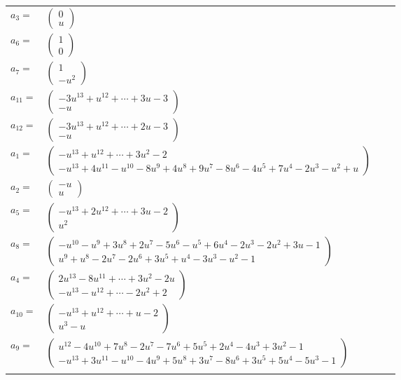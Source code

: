 \documentclass[1p]{elsarticle_modified}
\theoremstyle{definition}
\begin{document}
\begin{tabular}{m{7pt} m{180pt} m{7pt} m{180pt} }
\flushright $a_{3}=$&$\begin{pmatrix}0\\u\end{pmatrix}$ \\
\flushright $a_{6}=$&$\begin{pmatrix}1\\0\end{pmatrix}$ \\
\flushright $a_{7}=$&$\begin{pmatrix}1\\- u^2\end{pmatrix}$ \\
\flushright $a_{11}=$&$\begin{pmatrix}-3 u^{13}+u^{12}+\cdots+3 u-3\\- u\end{pmatrix}$ \\
\flushright $a_{12}=$&$\begin{pmatrix}-3 u^{13}+u^{12}+\cdots+2 u-3\\- u\end{pmatrix}$ \\
\flushright $a_{1}=$&$\begin{pmatrix}- u^{13}+u^{12}+\cdots+3 u^2-2\\- u^{13}+4 u^{11}- u^{10}-8 u^9+4 u^8+9 u^7-8 u^6-4 u^5+7 u^4-2 u^3- u^2+u\end{pmatrix}$ \\
\flushright $a_{2}=$&$\begin{pmatrix}- u\\u\end{pmatrix}$ \\
\flushright $a_{5}=$&$\begin{pmatrix}- u^{13}+2 u^{12}+\cdots+3 u-2\\u^2\end{pmatrix}$ \\
\flushright $a_{8}=$&$\begin{pmatrix}- u^{10}- u^9+3 u^8+2 u^7-5 u^6- u^5+6 u^4-2 u^3-2 u^2+3 u-1\\u^9+u^8-2 u^7-2 u^6+3 u^5+u^4-3 u^3- u^2-1\end{pmatrix}$ \\
\flushright $a_{4}=$&$\begin{pmatrix}2 u^{13}-8 u^{11}+\cdots+3 u^2-2 u\\- u^{13}- u^{12}+\cdots-2 u^2+2\end{pmatrix}$ \\
\flushright $a_{10}=$&$\begin{pmatrix}- u^{13}+u^{12}+\cdots+u-2\\u^3- u\end{pmatrix}$ \\
\flushright $a_{9}=$&$\begin{pmatrix}u^{12}-4 u^{10}+7 u^8-2 u^7-7 u^6+5 u^5+2 u^4-4 u^3+3 u^2-1\\- u^{13}+3 u^{11}- u^{10}-4 u^9+5 u^8+3 u^7-8 u^6+3 u^5+5 u^4-5 u^3-1\end{pmatrix}$\\&\end{tabular}
\end{document}
